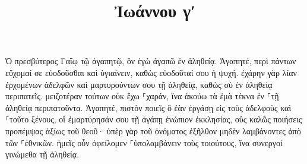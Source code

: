 \documentclass{openreader}
\title{Ἰωάννου γʹ}
\date{}
\begin{document}
\maketitle
\raggedbottom 
\fontsize{16pt}{24pt}\selectfont


Ὁ πρεσβύτερος Γαΐῳ τῷ ἀγαπητῷ, ὃν ἐγὼ ἀγαπῶ ἐν ἀληθείᾳ. 
Ἀγαπητέ, περὶ πάντων εὔχομαί σε εὐοδοῦσθαι καὶ ὑγιαίνειν, καθὼς εὐοδοῦταί σου ἡ ψυχή. 
ἐχάρην γὰρ λίαν ἐρχομένων ἀδελφῶν καὶ μαρτυρούντων σου τῇ ἀληθείᾳ, καθὼς σὺ ἐν ἀληθείᾳ περιπατεῖς. 
μειζοτέραν τούτων οὐκ ἔχω ⸀χαράν, ἵνα ἀκούω τὰ ἐμὰ τέκνα ἐν ⸀τῇ ἀληθείᾳ περιπατοῦντα. 
Ἀγαπητέ, πιστὸν ποιεῖς ὃ ἐὰν ἐργάσῃ εἰς τοὺς ἀδελφοὺς καὶ ⸀τοῦτο ξένους, 
οἳ ἐμαρτύρησάν σου τῇ ἀγάπῃ ἐνώπιον ἐκκλησίας, οὓς καλῶς ποιήσεις προπέμψας ἀξίως τοῦ θεοῦ· 
ὑπὲρ γὰρ τοῦ ὀνόματος ἐξῆλθον μηδὲν λαμβάνοντες ἀπὸ τῶν ⸀ἐθνικῶν. 
ἡμεῖς οὖν ὀφείλομεν ⸀ὑπολαμβάνειν τοὺς τοιούτους, ἵνα συνεργοὶ γινώμεθα τῇ ἀληθείᾳ. 
\end{document}
